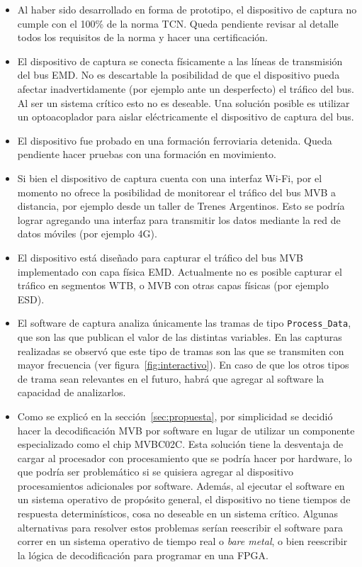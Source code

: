 \begin{itemize}
    \item Al haber sido desarrollado en forma de prototipo, el dispositivo de captura no cumple con el 100\% de la norma TCN. Queda pendiente revisar al detalle todos los requisitos de la norma y hacer una certificación.

    \item El dispositivo de captura se conecta físicamente a las líneas de transmisión del bus EMD. No es descartable la posibilidad de que el dispositivo pueda afectar inadvertidamente (por ejemplo ante un desperfecto) el tráfico del bus. Al ser un sistema crítico esto no es deseable. Una solución posible es utilizar un optoacoplador para aislar eléctricamente el dispositivo de captura del bus.

    \item El dispositivo fue probado en una formación ferroviaria detenida. Queda pendiente hacer pruebas con una formación en movimiento.

    \item Si bien el dispositivo de captura cuenta con una interfaz Wi-Fi, por el momento no ofrece la posibilidad de monitorear el tráfico del bus MVB a distancia, por ejemplo desde un taller de Trenes Argentinos. Esto se podría lograr agregando una interfaz para transmitir los datos mediante la red de datos móviles (por ejemplo 4G).

    \item El dispositivo está diseñado para capturar el tráfico del bus MVB implementado con capa física EMD. Actualmente no es posible capturar el tráfico en segmentos WTB, o MVB con otras capas físicas (por ejemplo ESD).

    \item El software de captura analiza únicamente las tramas de tipo \texttt{Process\_Data}, que son las que publican el valor de las distintas variables. En las capturas realizadas se observó que este tipo de tramas son las que se transmiten con mayor frecuencia (ver figura~\ref{fig:interactivo}). En caso de que los otros tipos de trama sean relevantes en el futuro, habrá que agregar al software la capacidad de analizarlos.

    \item Como se explicó en la sección~\ref{sec:propuesta}, por simplicidad se decidió hacer la decodificación MVB por software en lugar de utilizar un componente especializado como el chip MVBC02C.
    Esta solución tiene la desventaja de cargar al procesador con procesamiento que se podría hacer por hardware, lo que podría ser problemático si se quisiera agregar al dispositivo procesamientos adicionales por software.
    Además, al ejecutar el software en un sistema operativo de propósito general, el dispositivo no tiene tiempos de respuesta determinísticos, cosa no deseable en un sistema crítico.
    Algunas alternativas para resolver estos problemas serían reescribir el software para correr en un sistema operativo de tiempo real o \textit{bare metal}, o bien reescribir la lógica de decodificación para programar en una FPGA.
\end{itemize}
